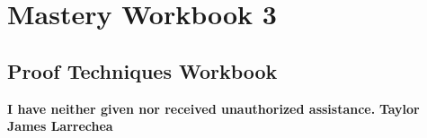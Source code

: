 \clearpage
\chapter{Mastery Workbook 3}

\section{Proof Techniques Workbook}


\begin{center}
    \Large{\textbf{I have neither given nor received unauthorized assistance.}}
    \large{\textbf{Taylor James Larrechea}}
\end{center}


